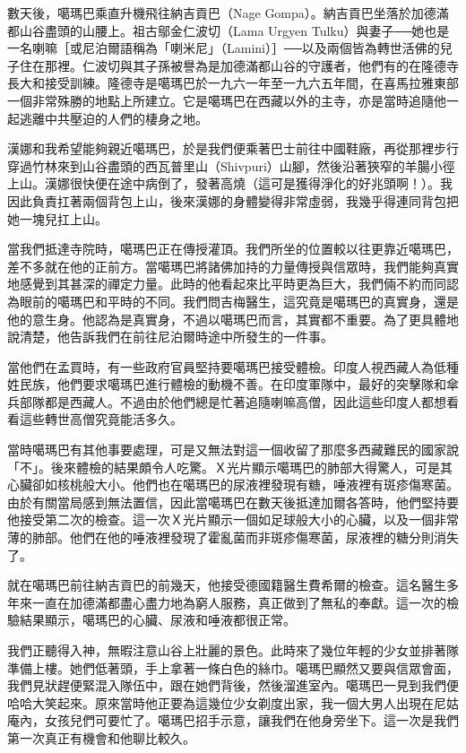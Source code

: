 數天後，噶瑪巴乘直升機飛往納吉貢巴（Nage
Gompa）。納吉貢巴坐落於加德滿都山谷盡頭的山腰上。祖古鄔金仁波切（Lama
Urgyen
Tulku）與妻子──她也是一名喇嘛［或尼泊爾語稱為「喇米尼」（Lamini）］──以及兩個皆為轉世活佛的兒子住在那裡。仁波切與其子孫被譽為是加德滿都山谷的守護者，他們有的在隆德寺長大和接受訓練。隆德寺是噶瑪巴於一九六一年至一九六五年間，在喜馬拉雅東部一個非常殊勝的地點上所建立。它是噶瑪巴在西藏以外的主寺，亦是當時追隨他一起逃離中共壓迫的人們的棲身之地。

漢娜和我希望能夠親近噶瑪巴，於是我們便乘著巴士前往中國鞋廠，再從那裡步行穿過竹林來到山谷盡頭的西瓦普里山（Shivpuri）山腳，然後沿著狹窄的羊腸小徑上山。漢娜很快便在途中病倒了，發著高燒（這可是獲得淨化的好兆頭啊！）。我因此負責扛著兩個背包上山，後來漢娜的身體變得非常虛弱，我幾乎得連同背包把她一塊兒扛上山。

當我們抵達寺院時，噶瑪巴正在傳授灌頂。我們所坐的位置較以往更靠近噶瑪巴，差不多就在他的正前方。當噶瑪巴將諸佛加持的力量傳授與信眾時，我們能夠真實地感覺到其甚深的禪定力量。此時的他看起來比平時更為巨大，我們倆不約而同認為眼前的噶瑪巴和平時的不同。我們問吉梅醫生，這究竟是噶瑪巴的真實身，還是他的意生身。他認為是真實身，不過以噶瑪巴而言，其實都不重要。為了更具體地說清楚，他告訴我們在前往尼泊爾時途中所發生的一件事。

當他們在孟買時，有一些政府官員堅持要噶瑪巴接受體檢。印度人視西藏人為低種姓民族，他們要求噶瑪巴進行體檢的動機不善。在印度軍隊中，最好的突擊隊和傘兵部隊都是西藏人。不過由於他們總是忙著追隨喇嘛高僧，因此這些印度人都想看看這些轉世高僧究竟能活多久。

當時噶瑪巴有其他事要處理，可是又無法對這一個收留了那麼多西藏難民的國家說「不」。後來體檢的結果頗令人吃驚。Ｘ光片顯示噶瑪巴的肺部大得驚人，可是其心臟卻如核桃般大小。他們也在噶瑪巴的尿液裡發現有糖，唾液裡有斑疹傷寒菌。由於有關當局感到無法置信，因此當噶瑪巴在數天後抵達加爾各答時，他們堅持要他接受第二次的檢查。這一次Ｘ光片顯示一個如足球般大小的心臟，以及一個非常薄的肺部。他們在他的唾液裡發現了霍亂菌而非斑疹傷寒菌，尿液裡的糖分則消失了。

就在噶瑪巴前往納吉貢巴的前幾天，他接受德國籍醫生費希爾的檢查。這名醫生多年來一直在加德滿都盡心盡力地為窮人服務，真正做到了無私的奉獻。這一次的檢驗結果顯示，噶瑪巴的心臟、尿液和唾液都很正常。

我們正聽得入神，無暇注意山谷上壯麗的景色。此時來了幾位年輕的少女並排著隊準備上樓。她們低著頭，手上拿著一條白色的絲巾。噶瑪巴顯然又要與信眾會面，我們見狀趕便緊混入隊伍中，跟在她們背後，然後溜進室內。噶瑪巴一見到我們便哈哈大笑起來。原來當時他正要為這幾位少女剃度出家，我一個大男人出現在尼姑庵內，女孩兒們可要忙了。噶瑪巴招手示意，讓我們在他身旁坐下。這一次是我們第一次真正有機會和他聊比較久。

